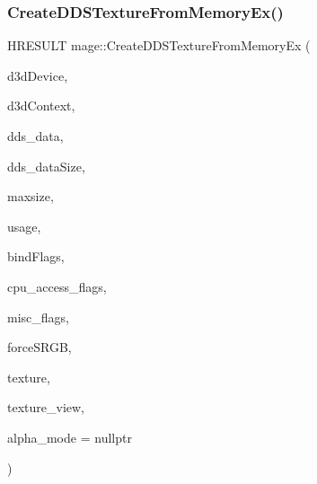 \subsubsection{\texorpdfstring{Create\+D\+D\+S\+Texture\+From\+Memory\+Ex()}{CreateDDSTextureFromMemoryEx()}\hspace{0.1cm}{\footnotesize\ttfamily [2/4]}}
{\footnotesize\ttfamily H\+R\+E\+S\+U\+LT mage\+::\+Create\+D\+D\+S\+Texture\+From\+Memory\+Ex (\begin{DoxyParamCaption}\item[{\+\_\+\+In\+\_\+ I\+D3\+D11\+Device $\ast$}]{d3d\+Device,  }\item[{\+\_\+\+In\+\_\+opt\+\_\+ I\+D3\+D11\+Device\+Context $\ast$}]{d3d\+Context,  }\item[{\+\_\+\+In\+\_\+reads\+\_\+bytes\+\_\+(dds\+\_\+data\+Size) const uint8\+\_\+t $\ast$}]{dds\+\_\+data,  }\item[{\+\_\+\+In\+\_\+ size\+\_\+t}]{dds\+\_\+data\+Size,  }\item[{\+\_\+\+In\+\_\+ size\+\_\+t}]{maxsize,  }\item[{\+\_\+\+In\+\_\+ D3\+D11\+\_\+\+U\+S\+A\+GE}]{usage,  }\item[{\+\_\+\+In\+\_\+ uint32\+\_\+t}]{bind\+Flags,  }\item[{\+\_\+\+In\+\_\+ uint32\+\_\+t}]{cpu\+\_\+access\+\_\+flags,  }\item[{\+\_\+\+In\+\_\+ uint32\+\_\+t}]{misc\+\_\+flags,  }\item[{\+\_\+\+In\+\_\+ bool}]{force\+S\+R\+GB,  }\item[{\+\_\+\+Outptr\+\_\+opt\+\_\+ I\+D3\+D11\+Resource $\ast$$\ast$}]{texture,  }\item[{\+\_\+\+Outptr\+\_\+opt\+\_\+ I\+D3\+D11\+Shader\+Resource\+View $\ast$$\ast$}]{texture\+\_\+view,  }\item[{\+\_\+\+Out\+\_\+opt\+\_\+ \hyperlink{namespacemage_a0c586a2bad862f4858900ca121ca80c2}{D\+D\+S\+\_\+\+A\+L\+P\+H\+A\+\_\+\+M\+O\+DE} $\ast$}]{alpha\+\_\+mode = {\ttfamily nullptr} }\end{DoxyParamCaption})}

\hypertarget{namespacemage_aefe8be9cf3ce2f8fb9615346ac53868f}{}\label{namespacemage_aefe8be9cf3ce2f8fb9615346ac53868f} 
